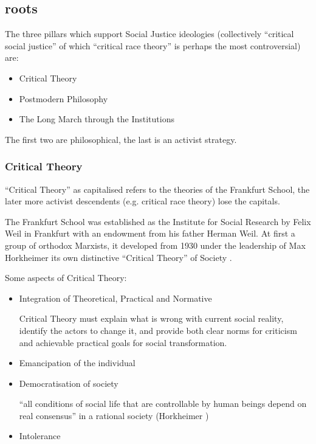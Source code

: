 \documentclass[10pt,titlepage]{book}
\begin{document}
\subsection{roots}

The three pillars which support Social Justice ideologies (collectively ``critical social justice'' of which ``critical race theory'' is perhaps the most controversial) are:

\begin{itemize}
\item Critical Theory
\item Postmodern Philosophy
\item The Long March through the Institutions
\end{itemize}

The first two are philosophical, the last is an activist strategy.

\subsubsection{Critical Theory}

``Critical Theory'' as capitalised refers to the theories of the Frankfurt School, the later more activist descendents (e.g. critical race theory) lose the capitals.

The Frankfurt School was established as the Institute for Social Research by Felix Weil in Frankfurt with an endowment from his father Herman Weil.
At first a group of orthodox Marxists, it developed from 1930 under the leadership of Max Horkheimer its own distinctive ``Critical Theory'' of Society \cite{horkheimer-trad,horkheimer-crit}.


Some aspects of Critical Theory:

\begin{itemize}
\item Integration of Theoretical, Practical and Normative

  Critical Theory must explain what is wrong with current social reality, identify the actors to change it, and provide both clear norms for criticism and achievable practical goals for social transformation.
  
\item Emancipation of the individual
  
\item Democratisation of society

  “all conditions of social life that are controllable by human beings depend on real consensus” in a rational society (Horkheimer \cite{horkheimer-crit})

  \item Intolerance
\end{itemize}
\end{document}
